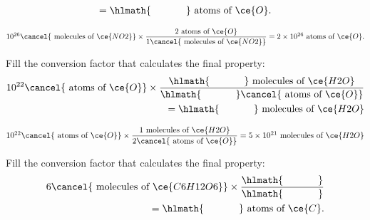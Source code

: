 \documentclass[main.tex]{subfiles}
\begin{document}
\begin{multicols*}{2}
\begin{question}[ID=\the\value{numA}]
\begin{equation*}
\begin{split}
=\hlmath{\hspace{35pt}}\text{ atoms of }\ce{O}.
\end{split}\end{equation*}
\end{question}
\begin{solution}
$
10^{26}\cancel{\text{ molecules of }\ce{NO2}} \times \dfrac{2\text{ atoms of }\ce{O}}{1\cancel{\text{ molecules of }\ce{NO2}}}
=2\times10^{26}\text{ atoms of }\ce{O}.
$
\hspace{0.1cm}\end{solution}%
\begin{question}[ID=\the\value{numA}]
Fill the conversion factor that calculates the final property:
 \begin{equation*}\begin{split}
10^{22}\cancel{\text{ atoms of }\ce{O}} \times \dfrac{\hlmath{\hspace{35pt}}\text{ molecules of }\ce{H2O}}{\hlmath{\hspace{35pt}}\cancel{\text{ atoms of }\ce{O}}}\\
=\hlmath{\hspace{35pt}}\text{ molecules of }\ce{H2O}
\end{split}\end{equation*}
\end{question}
\begin{solution}
$
10^{22}\cancel{\text{ atoms of }\ce{O}} \times \dfrac{ 1\text{ molecules of }\ce{H2O}}{2\cancel{\text{ atoms of }\ce{O}}}
=5\times 10^{21}\text{ molecules of }\ce{H2O}
$
\hspace{0.1cm}\end{solution}%
\begin{question}[ID=\the\value{numA}]
Fill the conversion factor that calculates the final property:
 \begin{equation*}\begin{split}
6\cancel{\text{ molecules of }\ce{C6H12O6}} \times \dfrac{\hlmath{\hspace{35pt}}}{\hlmath{\hspace{35pt}}}\\
=\hlmath{\hspace{35pt}}\text{ atoms of }\ce{C}.
\end{split}\end{equation*}
\end{question}

\end{multicols*}
\end{document}
